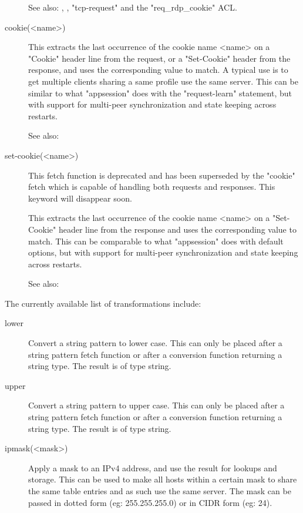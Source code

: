 \begin{description}
               See also: , ,
               "tcp-request" and the "req\_rdp\_cookie" ACL.

\item[cookie(<name>)]
               This extracts the last occurrence of the cookie name <name> on a
               "Cookie" header line from the request, or a "Set-Cookie" header
               from the response, and uses the corresponding value to match. A
               typical use is to get multiple clients sharing a same profile
               use the same server. This can be similar to what "appsession"
               does with the "request-learn" statement, but with support for
               multi-peer synchronization and state keeping across restarts.

               See also: 

\item[set-cookie(<name>)]
               This fetch function is deprecated and has been superseded by the
               "cookie" fetch which is capable of handling both requests and
               responses. This keyword will disappear soon.

               This extracts the last occurrence of the cookie name <name> on a
               "Set-Cookie" header line from the response and uses the
               corresponding value to match. This can be comparable to what
               "appsession" does with default options, but with support for
                multi-peer synchronization and state keeping across restarts.
                
                See also: 
\end{description}

The currently available list of transformations include:

\begin{description}
\item[lower]
               Convert a string pattern to lower case. This can only be placed
               after a string pattern fetch function or after a conversion
               function returning a string type. The result is of type string.

\item[upper]
               Convert a string pattern to upper case. This can only be placed
               after a string pattern fetch function or after a conversion
               function returning a string type. The result is of type string.

\item[ipmask(<mask>)]
               Apply a mask to an IPv4 address, and use the result for lookups
               and storage. This can be used to make all hosts within a
               certain mask to share the same table entries and as such use
               the same server. The mask can be passed in dotted form (eg:
               255.255.255.0) or in CIDR form (eg: 24).
\end{description}